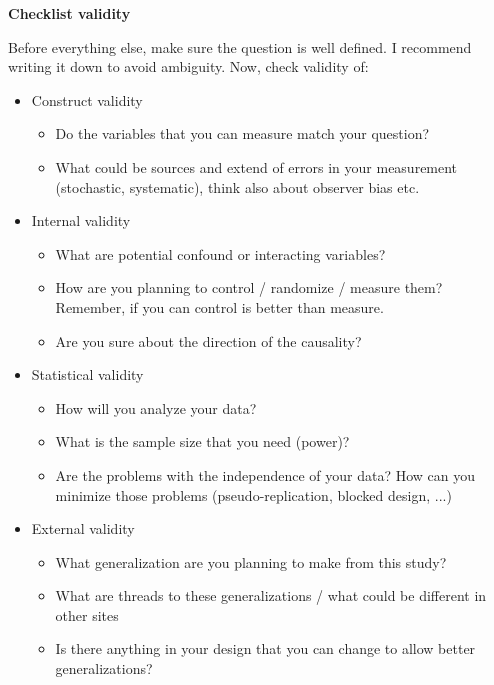 \documentclass{tufte-book}
\begin{document}
\begin{mdframed}
    
\textbf{Checklist validity}%

Before everything else, make sure the question is well defined. I recommend writing it down to avoid ambiguity. Now, check validity of:

    \begin{itemize}
      \item Construct validity
      \begin{itemize}
        \item Do the variables that you can measure match your question?
        \item What could be sources and extend of errors in your measurement (stochastic, systematic), think also about observer bias etc.
      \end{itemize}
      
      \item Internal validity
      \begin{itemize}
        \item What are potential confound or interacting variables?
        \item How are you planning to control / randomize / measure them? Remember, if you can control is better than measure.
        \item Are you sure about the direction of the causality?
      \end{itemize}     
       
      \item Statistical validity
      \begin{itemize}
        \item How will you analyze your data?
        \item What is the sample size that you need (power)?
        \item Are the problems with the independence of your data? How can you minimize those problems (pseudo-replication, blocked design, ...)
      \end{itemize} 
         
      \item External validity
      \begin{itemize}
        \item What generalization are you planning to make from this study?
        \item What are threads to these generalizations / what could be different in other sites
        \item Is there anything in your design that you can change to allow better generalizations?
      \end{itemize}   
    \end{itemize}

\end{mdframed}
\end{document}
